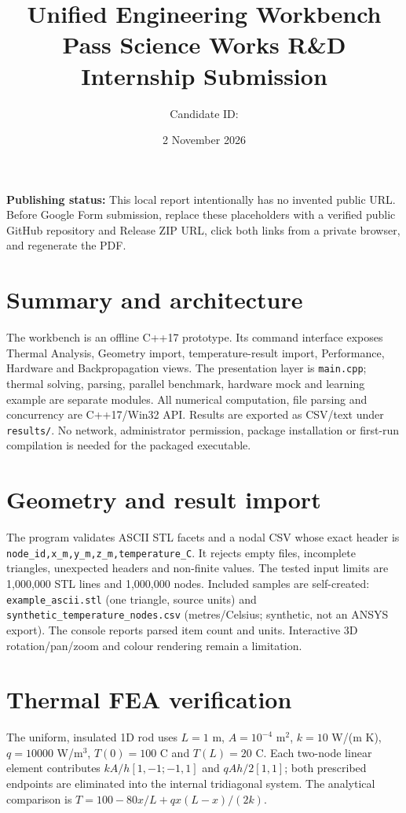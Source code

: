 \documentclass[10pt]{article}
\title{Unified Engineering Workbench\\\large Pass Science Works R\&D Internship Submission}
\author{Candidate ID: \underline{\hspace{2.3in}}}\date{2 November 2026}
\begin{document}
\maketitle
\textbf{Publishing status:} This local report intentionally has no invented public URL. Before Google Form submission, replace these placeholders with a verified public GitHub repository and Release ZIP URL, click both links from a private browser, and regenerate the PDF.

\section*{Summary and architecture}
The workbench is an offline C++17 prototype. Its command interface exposes Thermal Analysis, Geometry import, temperature-result import, Performance, Hardware and Backpropagation views. The presentation layer is \texttt{main.cpp}; thermal solving, parsing, parallel benchmark, hardware mock and learning example are separate modules. All numerical computation, file parsing and concurrency are C++17/Win32 API. Results are exported as CSV/text under \texttt{results/}. No network, administrator permission, package installation or first-run compilation is needed for the packaged executable.

\section*{Geometry and result import}
The program validates ASCII STL facets and a nodal CSV whose exact header is \texttt{node\_id,x\_m,y\_m,z\_m,temperature\_C}. It rejects empty files, incomplete triangles, unexpected headers and non-finite values. The tested input limits are 1,000,000 STL lines and 1,000,000 nodes. Included samples are self-created: \texttt{example\_ascii.stl} (one triangle, source units) and \texttt{synthetic\_temperature\_nodes.csv} (metres/Celsius; synthetic, not an ANSYS export). The console reports parsed item count and units. Interactive 3D rotation/pan/zoom and colour rendering remain a limitation.

\section*{Thermal FEA verification}
The uniform, insulated 1D rod uses $L=1$ m, $A=10^{-4}$ m$^2$, $k=10$ W/(m K), $q=10000$ W/m$^3$, $T(0)=100$ C and $T(L)=20$ C. Each two-node linear element contributes $kA/h[1,-1;-1,1]$ and $qAh/2[1,1]$; both prescribed endpoints are eliminated into the internal tridiagonal system. The analytical comparison is $T=100-80x/L+q x(L-x)/(2k)$.
\end{document}
